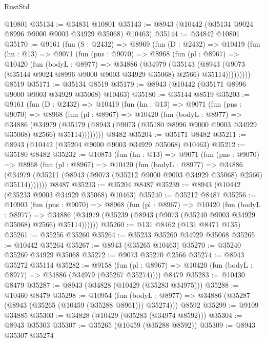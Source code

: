 \begin{lexlean}{RustStd}
\begin{coremodule}
{\begin{coremodule}
{{{{{{{{{{{{{{{{{{{{{{{{{{{{{{{{{{{{{{{    @10801
@35134 := @34831 @10801
@35143 := @8943 (@10442 (@35134 @9024 @8996 @9000 @9003 @34929 @35068) @10463)
@35144 := @34842 @10801
@35170 := @9161
    (fun (S : @2432) =>
    @8969
      (fun (D : @2432) =>
      @10419
        (fun (hn : @13) =>
        @9071
          (fun (pns : @9070) =>
          @8968
            (fun (pl : @8967) =>
            @10420
              (fun (bodyL : @8977) =>
              @34886
                (@34979
                  (@35143
                    (@8943
                      (@9073 (@35144 @9024 @8996 @9000 @9003 @34929 @35068) @2566)
                      @35114)))))))))
    @8519
@35171 := @35134 @8519
@35179 := @8943 (@10442 (@35171 @8996 @9000 @9003 @34929 @35068) @10463)
@35180 := @35144 @8519
@35203 := @9161
    (fun (D : @2432) =>
    @10419
      (fun (hn : @13) =>
      @9071
        (fun (pns : @9070) =>
        @8968
          (fun (pl : @8967) =>
          @10420
            (fun (bodyL : @8977) =>
            @34886
              (@34979
                (@35179 (@8943 (@9073 (@35180 @8996 @9000 @9003 @34929 @35068) @2566) @35114))))))))
    @8482
@35204 := @35171 @8482
@35211 := @8943 (@10442 (@35204 @9000 @9003 @34929 @35068) @10463)
@35212 := @35180 @8482
@35232 := @10873
    (fun (hn : @13) =>
    @9071
      (fun (pns : @9070) =>
      @8968
        (fun (pl : @8967) =>
        @10420
          (fun (bodyL : @8977) =>
          @34886
            (@34979 (@35211 (@8943 (@9073 (@35212 @9000 @9003 @34929 @35068) @2566) @35114)))))))
    @8487
@35233 := @35204 @8487
@35239 := @8943 (@10442 (@35233 @9003 @34929 @35068) @10463)
@35240 := @35212 @8487
@35256 := @10903
    (fun (pns : @9070) =>
    @8968
      (fun (pl : @8967) =>
      @10420
        (fun (bodyL : @8977) =>
        @34886 (@34979 (@35239 (@8943 (@9073 (@35240 @9003 @34929 @35068) @2566) @35114))))))
@35260 := @131 @8462 (@131 @8471 @135)
@35261 := @35256 @35260
@35264 := @35233 @35260 @34929 @35068
@35265 := @10442 @35264
@35267 := @8943 (@35265 @10463)
@35270 := @35240 @35260 @34929 @35068
@35272 := @9073 @35270 @2566
@35274 := @8943 @35272 @35114
@35282 := @9158
    (fun (pl : @8967) => @10420 (fun (bodyL : @8977) => @34886 (@34979 (@35267 @35274))))
    @8479
@35283 := @10430 @8479
@35287 := @8943 (@34828 (@10429 (@35283 @34975)))
@35288 := @10460 @8479
@35298 := @10954
    (fun (bodyL : @8977) => @34886 (@35287 (@8943 (@35265 (@10459 (@35288 @8961))) @35274)))
    @8592
@35299 := @9109 @34885
@35303 := @34828 (@10429 (@35283 (@34974 @8592)))
@35304 := @8943 @35303
@35307 := @35265 (@10459 (@35288 @8592))
@35309 := @8943 @35307 @35274
}}}}}}}}}}}}}}}}}}}}}}}}}}}}}}}}}}}}}}}
\end{coremodule}}
\end{coremodule}
\end{lexlean}
